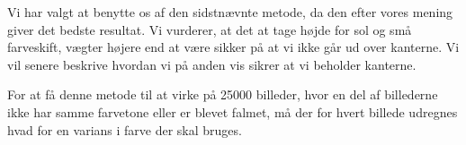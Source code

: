 {Vi har valgt at benytte os af den sidstnævnte metode, da den efter vores
mening giver det bedste resultat. Vi vurderer, at det at tage højde for sol og
små farveskift, vægter højere end at være sikker på at vi ikke går ud
over kanterne. Vi vil senere beskrive hvordan vi på anden vis sikrer at
vi beholder kanterne.

For at få denne metode til at virke på 25000 billeder, hvor en del af
billederne ikke har samme farvetone eller er blevet falmet, må der
for hvert billede udregnes hvad for en varians i farve der skal bruges.

}

